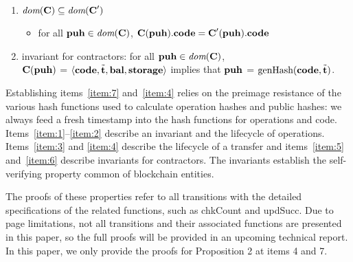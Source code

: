 \documentclass[runningheads]{llncs}
\begin{document}
\begin{proposition}
\begin{enumerate}
 \item\label{item:5} $ \textit{dom} (\textbf{C}) \subseteq \textit{dom} (\textbf{C}')$
   \begin{itemize}
   \item for all $\textbf{puh} \in \textit{dom} (\textbf{C})$,
     $\textbf{C} (\textbf{puh}).\textbf{code} = \textbf{C}' (\textbf{puh}).\textbf{code}$
   \end{itemize}
 \item\label{item:6} invariant for contractors:
   for all $\textbf{puh} \in \textit{dom} (\textbf{C})$, \\
    $\textbf{C} (\textbf{puh})$ = $\langle \textbf{code}, \tilde{\textbf{t}}, \textbf{bal}, \textbf{storage}\rangle$
   implies that $\textbf{puh}$ = $\textup{genHash} (\textbf{code}, \tilde{\textbf{t}})$.
\end{enumerate}
\end{proposition}
Establishing items~\ref{item:7} and~\ref{item:4} relies on the preimage resistance of the
various hash functions used to calculate operation hashes and public
hashes: we always feed a fresh timestamp into the hash
functions for operations and code. Items~\ref{item:1}--\ref{item:2} describe an invariant and
the lifecycle of 
operations. Items~\ref{item:3} and \ref{item:4} describe the lifecycle
of a transfer and items~\ref{item:5} and~\ref{item:6} describe
invariants for contractors. The invariants establish the
self-verifying property common of blockchain entities.

The proofs of these properties refer to all transitions with the detailed specifications of the related functions, such as chkCount and updSucc. Due to page limitations, not all transitions and their associated functions are presented in this paper, so the full proofs will be provided in an upcoming technical report. In this paper, we only provide the proofs for Proposition 2 at items 4 and 7.  
\end{document}
